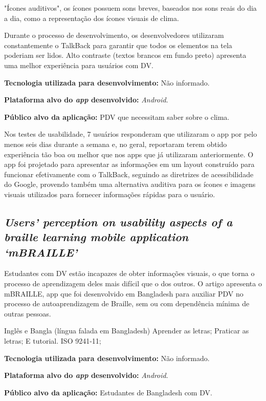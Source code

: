 "Ícones auditivos", os ícones possuem sons breves, baseados nos sons reais do dia a dia, como a representação dos ícones visuais de clima.

Durante o processo de desenvolvimento, os desenvolvedores utilizaram constantemente o TalkBack para garantir que todos os elementos na tela poderiam ser lidos.
Alto contraste (textos brancos em fundo preto) apresenta uma melhor experiência para usuários com DV.

\textbf{Tecnologia utilizada para desenvolvimento:} Não informado.

\textbf{Plataforma alvo do \emph{app} desenvolvido:} \emph{Android}.

\textbf{Público alvo da aplicação:} PDV que necessitam saber sobre o clima\@.

Nos testes de usabilidade, 7 usuários responderam que utilizaram o app por pelo menos seis dias durante a semana e, no geral, reportaram terem obtido experiência tão boa ou melhor que nos apps que já utilizaram anteriormente.
O app foi projetado para apresentar as informações em um layout construído para funcionar efetivamente com o TalkBack, seguindo as diretrizes de acessibilidade do Google, provendo também uma alternativa auditiva para os ícones e imagens visuais utilizados para fornecer informações rápidas para o usuário.

\subsection{\emph{Users’ perception on usability aspects of a braille learning mobile application ‘mBRAILLE’}}

Estudantes com DV estão incapazes de obter informações visuais, o que torna o processo de aprendizagem deles mais difícil que o dos outros.
O artigo apresenta o mBRAILLE, app que foi desenvolvido em Bangladesh para auxiliar PDV no processo de autoaprendizagem de Braille, sem ou com dependência mínima de outras pessoas.

Inglês e Bangla (língua falada em Bangladesh)
Aprender as letras;
Praticar as letras;
E tutorial.
ISO 9241-11;

\textbf{Tecnologia utilizada para desenvolvimento:} Não informado.

\textbf{Plataforma alvo do \emph{app} desenvolvido:} \emph{Android}.

\textbf{Público alvo da aplicação:} Estudantes de Bangladesh com DV\@.

